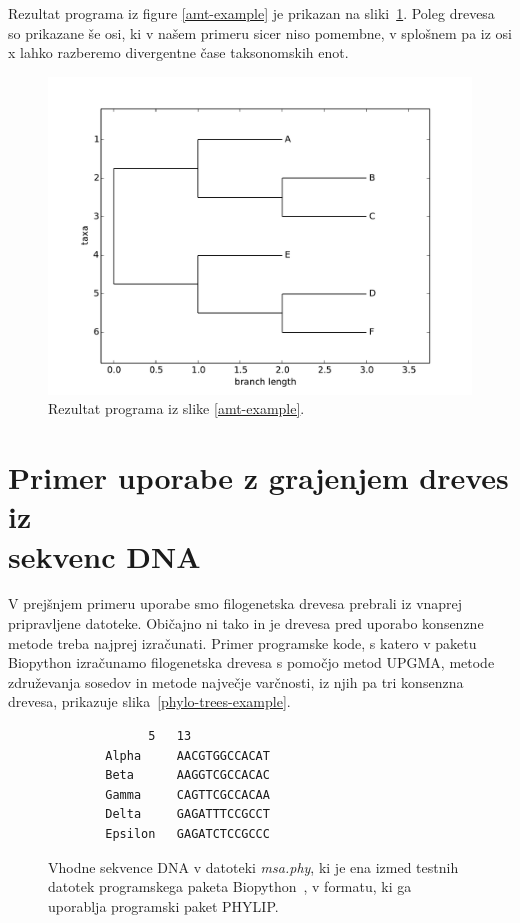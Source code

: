 \documentclass[a4paper, 12pt]{book}
\begin{document}
Rezultat programa iz figure \ref{amt-example} je prikazan na 
sliki~\ref{img-example-output}. Poleg drevesa so prikazane še osi, 
ki v našem primeru sicer niso pomembne, v splošnem pa iz osi x lahko 
razberemo divergentne čase taksonomskih enot. 
\\
\begin{figure}[h!]
	\begin{center}
		\includegraphics[scale=0.6, clip=true, trim=1cm 0 1cm 1cm]{gfx/ex_b.pdf}
	\end{center}
	\caption{Rezultat programa iz slike \ref{amt-example}.}
	\label{img-example-output}
\end{figure}

\section[Primer uporabe z grajenjem dreves iz sekvenc DNA]{Primer uporabe z grajenjem dreves iz\\ sekvenc DNA}
V prejšnjem primeru uporabe smo filogenetska drevesa prebrali iz vnaprej pripravljene
datoteke. Običajno ni tako in je drevesa pred uporabo konsenzne
metode treba najprej izračunati. Primer programske kode, s katero v paketu
Biopython izračunamo filogenetska drevesa s pomočjo metod UPGMA, metode združevanja 
sosedov in metode največje varčnosti, iz njih pa tri konsenzna drevesa, 
prikazuje slika~\ref{phylo-trees-example}.

\begin{figure}
\begin{lstlisting}
              5   13
        Alpha     AACGTGGCCACAT
        Beta      AAGGTCGCCACAC
        Gamma     CAGTTCGCCACAA
        Delta     GAGATTTCCGCCT
        Epsilon   GAGATCTCCGCCC
\end{lstlisting}
\caption{
Vhodne sekvence DNA v datoteki {\it msa.phy}, ki je ena izmed testnih datotek
programskega paketa Biopython~\cite{bio-phylo}, v formatu, ki ga uporablja 
programski paket PHYLIP.
}
\end{figure}
\end{document}
